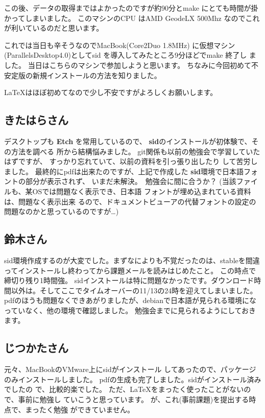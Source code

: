 \documentclass[mingoth,a4paper]{jsarticle}
\begin{document}
この後、データの取得まではよかったのですが約90分とmake にとても時間が掛
かってしまいました。
このマシンのCPU はAMD GeodeLX 500Mhz なのでこれが利いているのだと思います。

これでは当日も辛そうなのでMacBook(Core2Duo 1.8MHz) に仮想マシン
(ParallelsDesktop4.0)としてsid を導入してみたところ9分ほどでmake 終了し
ました。
当日はこちらのマシンで参加しようと思います。
ちなみに今回初めて不安定版の新規インストールの方法を知りました。

\LaTeX はほぼ初めてなので少し不安ですがよろしくお願いします。

\subsection{きたはらさん}
デスクトップも {\bf Etch} を常用しているので、
{\bf sid}のインストールが初体験で、その方法を調べる
所から結構悩みました。
git関係も以前の勉強会で学習していたはずですが、
すっかり忘れていて、以前の資料を引っ張り出したり
して苦労しました。
最終的にpdfは出来たのですが、上記で作成した
{\bf sid}環境で日本語フォントの部分が表示されず、
いまだ未解決。　勉強会に間に合うか？
(当該ファイルも、某OSでは問題なく表示でき、日本語
フォントが埋め込まれている資料は、問題なく表示出来
るので、ドキュメントビューアの代替フォントの設定の
問題なのかと思っているのですが…)

\subsection{鈴木さん}
sid環境作成するのが大変でした。まずなによりも不覚だったのは、stableを間違ってインストールし終わってから課題メールを読みはじめたこと。
この時点で締切り残り1時間強。
sidインストールは特に問題なかったです。ダウンロード時間以外は。そしてここでタイムオーバーの11/13の24時を迎えてしまいました。
pdfのほうも問題なくできあがりましたが、debianで日本語が見られる環境になっていなく、他の環境で確認しました。
勉強会までに見られるようにしておきます。

\subsection{じつかたさん}
元々、MacBookのVMware上にsidがインストール してあったので、パッケージのみインストールしました。
pdfの生成も完了しました。sidがインストール済みでしたの で、比較的楽でした。
ただ、\LaTeX をまったく使ったことがないので、事前に勉強し ていこうと思っています。
が、これ(事前課題)を提出する時点で、まったく勉強 ができていません。
\end{document}
